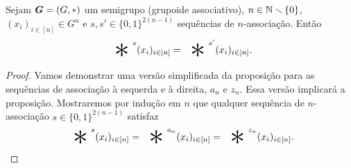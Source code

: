 \begin{proposition}
\label{prop:associatividade.generalizada}
Sejam $\bm G=(G,\ast)$ um semigrupo (grupoide associativo), $n \in \mathbb{N} \smallsetminus \{0\}$, $(x_i)_{i \in [n]} \in G^n$ e $s,s' \in \{0,1\}^{2(n-1)}$ sequências de $n$-associação. Então
	\begin{equation*}
	\bigopb\nolimits^{s} (x_i)_{i \in [n]} = \bigopb\nolimits^{s'} (x_i)_{i \in [n]}.
	\end{equation*}
\end{proposition}
\begin{proof}
Vamos demonstrar uma versão simplificada da proposição para as sequências de associação à esquerda e à direita, $a_n$ e $z_n$. Essa versão implicará a proposição. Mostraremos por indução em $n$ que qualquer sequência de $n$-associação $s \in \{0,1\}^{2(n-1)}$ satisfaz
	\begin{equation}
	\label{eq:sequencia.associacao.inducao}
	\bigopb\nolimits^{s} (x_i)_{i \in [n]} = \bigopb\nolimits^{a_n} (x_i)_{i \in [n]} = \bigopb\nolimits^{z_n} (x_i)_{i \in [n]}.
	\end{equation}


\end{proof}
